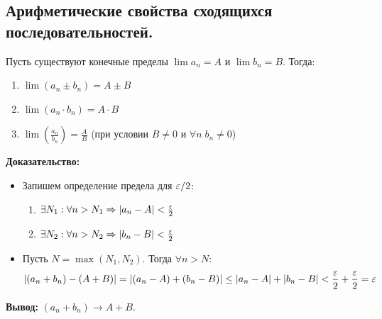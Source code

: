 \subsection{Арифметические свойства сходящихся последовательностей.}

Пусть существуют конечные пределы $\lim a_n = A$ и $\lim b_n = B$. Тогда:
\begin{enumerate}
    \item $\lim (a_n \pm b_n) = A \pm B$
    \item $\lim (a_n \cdot b_n) = A \cdot B$
    \item $\lim \left(\frac{a_n}{b_n}\right) = \frac{A}{B}$ (при условии $B \neq 0$ и $\forall n\; b_n \neq 0$)
\end{enumerate}

\begin{tcolorbox}[title=1. Предел суммы (разности)]
    \textbf{Доказательство:}
    \begin{itemize}
        \item Запишем определение предела для $\varepsilon/2$:
        \begin{enumerate}
            \item $\exists N_1: \forall n > N_1 \Rightarrow |a_n - A| < \frac{\varepsilon}{2}$
            \item $\exists N_2: \forall n > N_2 \Rightarrow |b_n - B| < \frac{\varepsilon}{2}$
        \end{enumerate}
        \item Пусть $N = \max(N_1, N_2)$. Тогда $\forall n > N$:
        $$ |(a_n + b_n) - (A + B)| = |(a_n - A) + (b_n - B)| \leq |a_n - A| + |b_n - B| < \frac{\varepsilon}{2} + \frac{\varepsilon}{2} = \varepsilon $$
    \end{itemize}
    \textbf{Вывод:} $(a_n + b_n) \to A+B$.
\end{tcolorbox}

